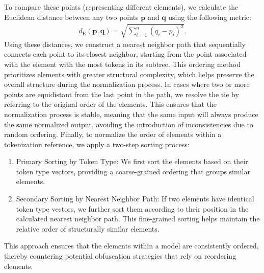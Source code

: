 To compare these points (representing different elements), we calculate the Euclidean distance between any two points $\mathbf{p}$ and $\mathbf{q}$ using the following metric:
\begin{align*}
    d_{\mathrm{E}}(\mathbf{p}, \mathbf{q}) = \sqrt{\sum_{i=1}^n (q_i-p_i)^2}.
\end{align*}
Using these distances, we construct a nearest neighbor path that sequentially connects each point to its closest neighbor, starting from the point associated with the element with the most tokens in its subtree. This ordering method prioritizes elements with greater structural complexity, which helps preserve the overall structure during the normalization process.
%
In cases where two or more points are equidistant from the last point in the path, we resolve the tie by referring to the original order of the elements. This ensures that the normalization process is stable, meaning that the same input will always produce the same normalized output, avoiding the introduction of inconsistencies due to random ordering.
%
%
Finally, to normalize the order of elements within a tokenization reference, we apply a two-step sorting process:
    \begin{enumerate}
        \item Primary Sorting by Token Type: We first sort the elements based on their token type vectors, providing a coarse-grained ordering that groups similar elements.
        \item Secondary Sorting by Nearest Neighbor Path: If two elements have identical token type vectors, we further sort them according to their position in the calculated nearest neighbor path. This fine-grained sorting helps maintain the relative order of structurally similar elements.
    \end{enumerate}
This approach ensures that the elements within a model are consistently ordered, thereby countering potential obfuscation strategies that rely on reordering elements.


